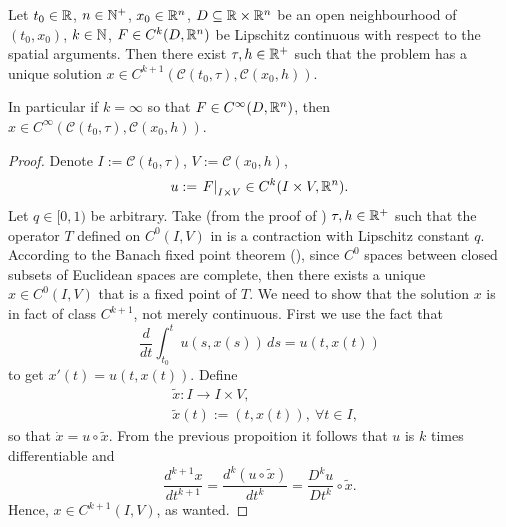 \begin{theorem}
  Let
    $t_0 \in \mathbb{R}$,
    $n \in \mathbb{N}^+$,
    $x_0 \in \mathbb{R}^n$,
    $D \subseteq \mathbb{R} \times \mathbb{R}^n$ be an open neighbourhood of $(t_0, x_0)$,
    $k \in \mathbb{N}$,
    $F \in C^k(D, \mathbb{R}^n)$ be
      Lipschitz continuous with respect to the spatial arguments.
  Then there exist $\tau, h \in \mathbb{R}^+$ such that the problem
  has a unique solution
  $x \in C^{k + 1}(\mathcal{C}(t_0, \tau), \mathcal{C}(x_0, h))$.

  In particular if $k = \infty$ so that $F \in C^\infty(D, \mathbb{R}^n)$, then
  $x \in C^\infty(\mathcal{C}(t_0, \tau), \mathcal{C}(x_0, h))$.
\end{theorem}
\begin{proof}
  Denote
    $I := \mathcal{C}(t_0, \tau)$,
    $V := \mathcal{C}(x_0, h)$,
  \begin{equation}
     u := \left. F \right|_{I \times V} \in C^k(I \times V, \mathbb{R}^n).
   \end{equation}
  Let $q \in [0, 1)$ be arbitrary.
  Take (from the proof of )
  $\tau, h \in \mathbb{R}^+$ such that the operator $T$ defined on $C^0(I, V)$ in
  is a contraction with Lipschitz constant $q$.
  According to the Banach fixed point theorem
  (), since $C^0$ spaces between closed
  subsets of Euclidean spaces are complete, then there exists a unique
  $x \in C^0(I, V)$ that is a fixed point of $T$.
  We need to show that the solution $x$ is in fact of class $C^{k + 1}$, not
  merely continuous.
  First we use the fact that
  \begin{equation}
    \frac{d}{d t} \int_{t_0}^t u(s, x(s))\, d s = u(t, x(t))
  \end{equation}
  to get $x'(t) = u(t, x(t))$.
  Define
  \begin{subequations}
    \begin{alignat}{1}
      & \tilde{x} \colon I \to I \times V, \\
      & \tilde{x}(t) := (t, x(t)),\ \forall t \in I,
    \end{alignat}
  \end{subequations}
  so that $\dot{x} = u \circ \tilde{x}$.
  From the previous propoition it follows that $u$ is $k$ times differentiable
  and
  \begin{equation}
    \frac{d^{k + 1} x}{d t^{k + 1}}
    = \frac{d^k (u \circ \tilde{x})}{d t^k}
    = \frac{D^k u}{D t^k} \circ \tilde{x}.
  \end{equation}
  Hence, $x \in C^{k + 1}(I, V)$, as wanted.
\end{proof}
